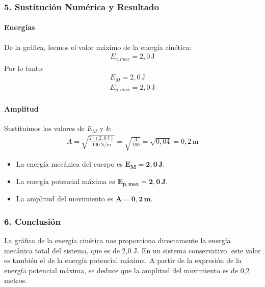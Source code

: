 \subsubsection*{5. Sustitución Numérica y Resultado}
\paragraph{Energías}
De la gráfica, leemos el valor máximo de la energía cinética:
\begin{gather}
    E_{c,max} = 2,0 \, \text{J}
\end{gather}
Por lo tanto:
\begin{gather}
    E_M = 2,0 \, \text{J} \\
    E_{p,max} = 2,0 \, \text{J}
\end{gather}

\paragraph{Amplitud}
Sustituimos los valores de $E_M$ y $k$:
\begin{gather}
    A = \sqrt{\frac{2 \cdot (2,0 \, \text{J})}{100 \, \text{N/m}}} = \sqrt{\frac{4}{100}} = \sqrt{0,04} = 0,2 \, \text{m}
\end{gather}
\begin{cajaresultado}
\begin{itemize}
    \item La energía mecánica del cuerpo es $\boldsymbol{E_M = 2,0 \, \textbf{J}}$.
    \item La energía potencial máxima es $\boldsymbol{E_{p,max} = 2,0 \, \textbf{J}}$.
    \item La amplitud del movimiento es $\boldsymbol{A = 0,2 \, \textbf{m}}$.
\end{itemize}
\end{cajaresultado}

\subsubsection*{6. Conclusión}
\begin{cajaconclusion}
La gráfica de la energía cinética nos proporciona directamente la energía mecánica total del sistema, que es de 2,0 J. En un sistema conservativo, este valor es también el de la energía potencial máxima. A partir de la expresión de la energía potencial máxima, se deduce que la amplitud del movimiento es de 0,2 metros.
\end{cajaconclusion}


